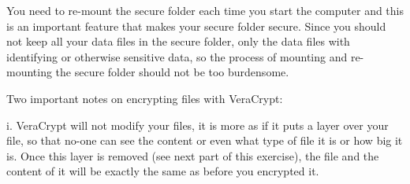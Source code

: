 \documentclass{tufte-handout}
\begin{document}
	You need to re-mount the secure folder each time you start the computer and this is an important feature that makes your secure folder secure. Since you should not keep all your data files in the secure folder, only the data files with identifying or otherwise sensitive data, so the process of mounting and re-mounting the secure folder should not be too burdensome.
	
	Two important notes on encrypting files with VeraCrypt:
	
	i. VeraCrypt will not modify your files, it is more as if it puts a layer over your file, so that no-one can see the content or even what type of file it is or how big it is. Once this layer is removed (see next part of this exercise), the file and the content of it will be exactly the same as before you encrypted it.
	
\end{document}
